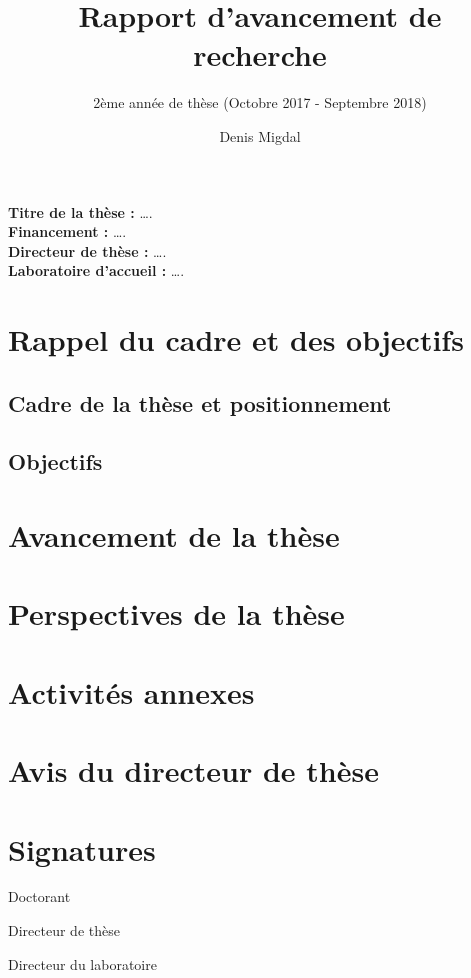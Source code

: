 \documentclass{scrartcl}
\begin{document}
\title{Rapport d'avancement de recherche}
\subtitle{2ème année de thèse (Octobre 2017 - Septembre 2018)}
\author{Denis Migdal}

\maketitle

\noindent{}\textbf{Titre de la thèse :} ….\\
\textbf{Financement :} ….\\
\textbf{Directeur de thèse :} ….\\
\textbf{Laboratoire d'accueil :} ….\\

\section{Rappel du cadre et des objectifs}

\subsection{Cadre de la thèse et positionnement}


\subsection{Objectifs}


\section{Avancement de la thèse}


\section{Perspectives de la thèse}


\section{Activités annexes}




\section*{Avis du directeur de thèse}


\section*{Signatures}
\begin{minipage}[b]{0.33333\textwidth}
Doctorant
\end{minipage}%
\begin{minipage}[b]{0.33333\textwidth}
Directeur de thèse
\end{minipage}%
\begin{minipage}[b]{0.33333\textwidth}
Directeur du laboratoire
\end{minipage}
\end{document}
